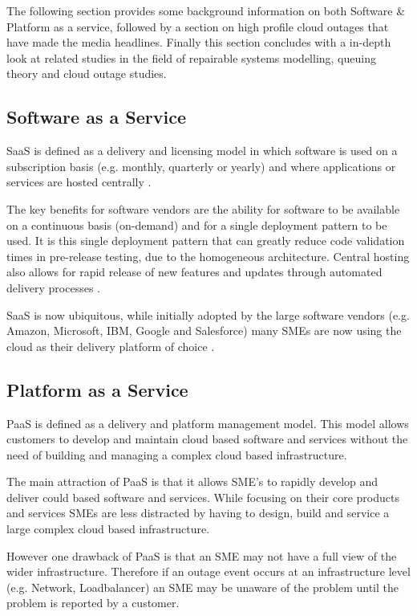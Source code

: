 \documentclass[5p]{elsarticle}
\begin{document}
The following section provides some background information on both Software \& Platform as a service, followed by a section on high profile cloud outages that have made the media headlines. Finally this section concludes with a in-depth look at related studies in the field of repairable systems modelling, queuing theory and cloud outage studies.

\subsection{Software as a Service}
SaaS is defined as a delivery and licensing model in which software is used on a subscription basis (e.g. monthly, quarterly or yearly) and where applications or services are hosted centrally \cite{cloudbook2015}.

The key benefits for software vendors are the ability for software to be available on a continuous basis (on-demand) and for a single deployment pattern to be used. It is this single deployment pattern that can greatly reduce code validation times in pre-release testing, due to the homogeneous architecture. Central hosting also allows for rapid release of new features and updates through automated delivery processes \cite{datacentre2015}. 

SaaS is now ubiquitous, while initially adopted by the large software vendors (e.g. Amazon, Microsoft, IBM, Google and Salesforce) many SMEs are now using the cloud as their delivery platform of choice \cite{CRN2015providers}. 

\subsection{Platform as a Service}
PaaS is defined as a delivery and platform management model. This model allows customers to develop and maintain cloud based software and services without the need of building and managing a complex cloud based infrastructure.

The main attraction of PaaS is that it allows SME's to rapidly develop and deliver could based software and services. While focusing on their core products and services SMEs are less distracted by having to design, build and service a large complex cloud based infrastructure. 

However one drawback of PaaS is that an SME may not have a full view of the wider infrastructure. Therefore if an outage event occurs at an infrastructure level (e.g. Network, Loadbalancer) an SME may be unaware of the problem until the problem is reported by a customer.
\end{document}
